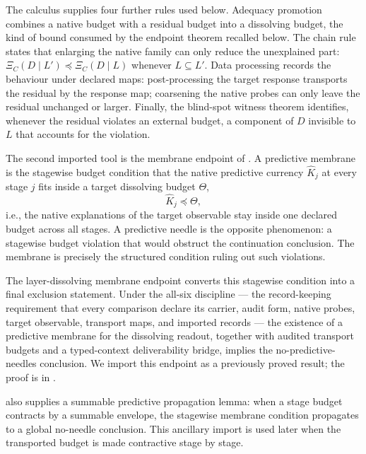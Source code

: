 \documentclass[11pt]{article}
\newcommand{\preceqq}{\preceq}
\theoremstyle{definition}
\begin{document}
The calculus supplies four further rules used below.  Adequacy
promotion combines a native budget with a residual budget into a
dissolving budget, the kind of bound consumed by the endpoint theorem
recalled below.  The chain rule states that enlarging the native
family can only reduce the unexplained part:
\(\Xi_C(D\mid L')\preceqq\Xi_C(D\mid L)\) whenever
\(L\subseteq L'\).  Data processing records the behaviour under
declared maps: post-processing the target response transports the
residual by the response map; coarsening the native probes can only
leave the residual unchanged or larger.  Finally, the blind-spot
witness theorem identifies, whenever the residual violates an external
budget, a component of \(D\) invisible to \(L\) that accounts for the
violation.

The second imported tool is the membrane endpoint of
\citet{Tsiokos2026NeedleKiller}.  A predictive membrane is the
stagewise budget condition that the native predictive currency
\(\widehat K_j\) at every stage \(j\) fits inside a target dissolving
budget \(\Theta\),
\[
  \widehat K_j \preceqq \Theta ,
\]
i.e., the native explanations of the target observable stay inside one
declared budget across all stages.  A predictive needle is the
opposite phenomenon: a stagewise budget violation that would obstruct
the continuation conclusion.  The membrane is precisely the structured
condition ruling out such violations.

The layer-dissolving membrane endpoint converts this stagewise
condition into a final exclusion statement.  Under the all-six
discipline --- the record-keeping requirement that every comparison
declare its carrier, audit form, native probes, target observable,
transport maps, and imported records --- the existence of a predictive
membrane for the dissolving readout, together with audited transport
budgets and a typed-context deliverability bridge, implies the
no-predictive-needles conclusion.  We import this endpoint as a
previously proved result; the proof is in
\citet{Tsiokos2026NeedleKiller}.

\citet{Tsiokos2026NeedleKiller} also supplies a summable predictive
propagation lemma: when a stage budget contracts by a summable
envelope, the stagewise membrane condition propagates to a global
no-needle conclusion.  This ancillary import is used later when the
transported budget is made contractive stage by stage.
\end{document}
